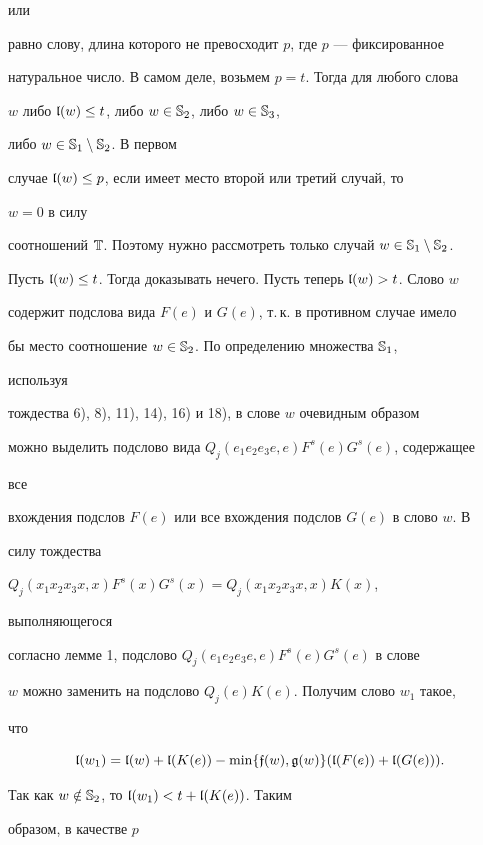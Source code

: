 или  


равно слову, длина которого не превосходит $p$, где $p$ --- фиксированное  


натуральное число. В самом деле, возьмем $p=t$. Тогда для любого слова  


$w$ либо $\frak l(w)\le t$, либо $w\in \Bbb S_2$, либо $w\in\Bbb S_3$, 


либо $w\in\Bbb S_1\setminus\Bbb S_2$. В первом  


случае $\frak l(w)\le p$, если имеет место второй или третий случай, то 


$w=0$ в силу  


соотношений $\Bbb T$. Поэтому нужно рассмотреть только случай $w\in\Bbb 


S_1\setminus\Bbb S_2$. 


Пусть $\frak l(w)\le t$. Тогда доказывать нечего. Пусть теперь $\frak 


l(w)>t$. Слово $w$ 


содержит подслова вида $F(e)$ и $G(e)$, т.\,к. в противном случае имело 


бы место соотношение $w\in\Bbb S_2$. По определению множества $\Bbb S_1$, 


используя  


тождества 6), 8), 11), 14), 16) и 18), в слове $w$ очевидным образом  


можно выделить подслово вида $Q_j(e_1e_2e_3e,e)F^s(e)G^s(e)$, содержащее 


все  


вхождения подслов $F(e)$ или все вхождения подслов $G(e)$ в слово $w$. В  


силу тождества 


$Q_j(x_1x_2x_3x,x)F^s(x)G^s(x)=Q_j(x_1x_2x_3x,x)K(x)$, 


выполняющегося  


согласно лемме 1, подслово $Q_j(e_1e_2e_3e,e)F^s(e)G^s(e)$ в слове  


$w$ можно заменить на подслово $Q_j(e)K(e)$. Получим слово $w_1$ такое, 


что 


$$ 


\frak l(w_1)=\frak l(w)+\frak l(K(e))-\min 


\{\frak f(w),\frak g(w)\}(\frak l(F(e))+\frak l(G(e))). 


$$ 


Так как $w\notin\Bbb S_2$, то $\frak l(w_1)<t+\frak l(K(e))$. Таким 


образом, в качестве $p$ 


